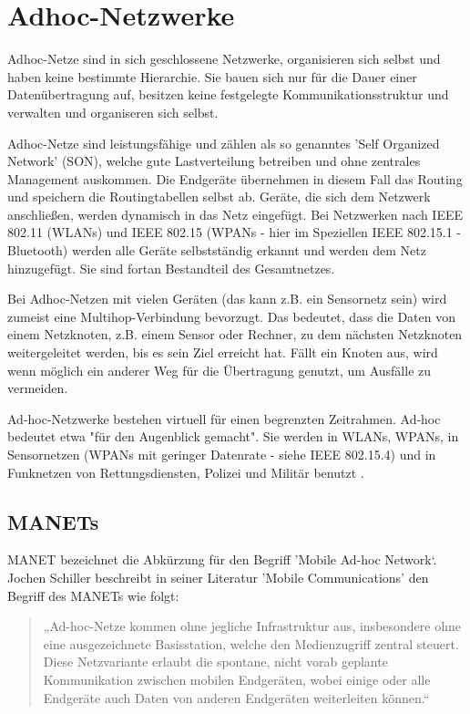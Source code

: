 \section{Adhoc-Netzwerke}\label{s:AdhocNetzwerke}

Adhoc-Netze sind in sich geschlossene Netzwerke, organisieren sich selbst und haben keine bestimmte Hierarchie. Sie bauen sich nur für die Dauer einer Datenübertragung auf, besitzen keine festgelegte Kommunikationsstruktur und verwalten und organiseren sich selbst. 

Adhoc-Netze sind leistungsfähige und zählen als so genanntes 'Self Organized Network' (SON), welche gute Lastverteilung betreiben und ohne zentrales Management auskommen. Die Endgeräte übernehmen in diesem Fall das Routing und speichern die Routingtabellen selbst ab. Geräte, die sich dem Netzwerk anschließen, werden dynamisch in das Netz eingefügt. Bei Netzwerken nach IEEE 802.11 (WLANs) und IEEE 802.15 (WPANs - hier im Speziellen IEEE 802.15.1 - Bluetooth) werden alle Geräte selbstständig erkannt und werden dem Netz hinzugefügt. Sie sind fortan Bestandteil des Gesamtnetzes. 

Bei Adhoc-Netzen mit vielen Geräten (das kann z.B. ein Sensornetz sein) wird zumeist eine Multihop-Verbindung bevorzugt. Das bedeutet, dass die Daten von einem Netzknoten, z.B. einem Sensor oder Rechner, zu dem nächsten Netzknoten weitergeleitet werden, bis es sein Ziel erreicht hat. Fällt ein Knoten aus, wird wenn möglich ein anderer Weg für die Übertragung genutzt, um Ausfälle zu vermeiden.

Ad-hoc-Netzwerke bestehen virtuell für einen begrenzten Zeitrahmen. Ad-hoc bedeutet etwa "für den Augenblick gemacht". Sie werden in WLANs, WPANs, in Sensornetzen (WPANs mit geringer Datenrate - siehe IEEE 802.15.4) und in Funknetzen von Rettungsdiensten, Polizei und Militär benutzt \cite{ws:lipinski}.

\subsection{MANETs}\label{ss:MANETs}

MANET bezeichnet die Abkürzung für den Begriff 'Mobile Ad-hoc Network‘. Jochen Schiller beschreibt in seiner Literatur 'Mobile Communications' den Begriff des MANETs wie folgt:
 
\begin{quote}
„Ad-hoc-Netze kommen ohne jegliche Infrastruktur aus, insbesondere ohne eine ausgezeichnete Basisstation, welche den Medienzugriff zentral steuert. Diese Netzvariante erlaubt die spontane, nicht vorab geplante Kommunikation zwischen mobilen Endgeräten, wobei einige oder alle Endgeräte auch Daten von anderen Endgeräten weiterleiten können.“
\end{quote}
	
